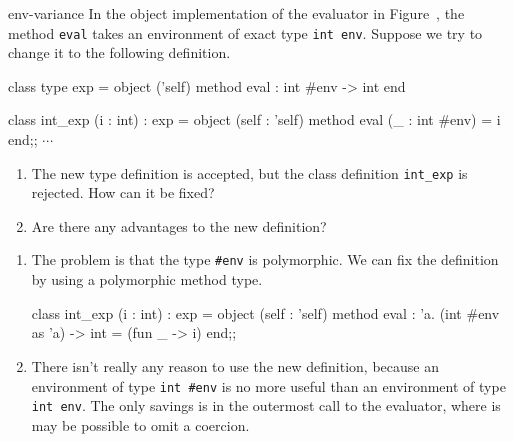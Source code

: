 
\begin{exercise}{env-variance}
In the object implementation of the evaluator in
Figure~, the method \hbox{\lstinline$eval$}
takes an environment of exact type \hbox{\lstinline$int env$}.  Suppose we
try to change it to the following definition.

\begin{ocaml}
class type exp =
  object ('self)
    method eval : int #env -> int
  end

class int_exp (i : int) : exp =
  object (self : 'self)
    method eval (_ : int #env) = i
  end;;
$\cdots$
\end{ocaml}
%
\begin{enumerate}
\item

The new type definition is accepted, but the class
definition \hbox{\lstinline$int_exp$} is rejected.  How can it be fixed?

\item Are there any advantages to the new definition?
\end{enumerate}

\begin{answer}\ifanswers
\begin{enumerate}
\item

The problem is that the type \hbox{\lstinline$#env$} is polymorphic.
We can fix the definition by using a polymorphic method type.

\begin{ocaml}
class int_exp (i : int) : exp =
  object (self : 'self)
    method eval : 'a. (int #env as 'a) -> int = (fun _ -> i)
  end;;
\end{ocaml}

\item

There isn't really any reason to use the new definition, because 
an environment of type \hbox{\lstinline$int #env$} is no more useful than
an environment of type \hbox{\lstinline$int env$}.  The only savings is
in the outermost call to the evaluator, where is may be possible
to omit a coercion.
\end{enumerate}
\fi\end{answer}
\end{exercise}


